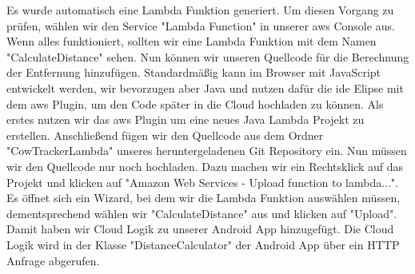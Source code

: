 Es wurde automatisch eine Lambda Funktion generiert. Um diesen Vorgang zu prüfen, wählen wir den Service "Lambda Function" in unserer \gls{aws} Console aus. Wenn alles funktioniert, sollten wir eine Lambda Funktion mit dem Namen "CalculateDistance" sehen. Nun können wir unseren Quellcode für die Berechnung der Entfernung hinzufügen. Standardmäßig kann im Browser mit JavaScript entwickelt werden, wir bevorzugen aber Java und nutzen dafür die \gls{ide} Elipse mit dem \gls{aws} Plugin, um den Code später in die Cloud hochladen zu können. Als erstes nutzen wir das \gls{aws} Plugin um eine neues Java Lambda Projekt zu erstellen. Anschließend fügen wir den Quellcode aus dem Ordner "CowTrackerLambda" unseres heruntergeladenen Git Repository ein. Nun müssen wir den Quellcode nur noch hochladen. Dazu machen wir ein Rechtsklick auf das Projekt und klicken auf "Amazon Web Services - Upload function to lambda...". Es öffnet sich ein Wizard, bei dem wir die Lambda Funktion auswählen müssen, dementsprechend wählen wir "CalculateDistance" aus und klicken auf "Upload". Damit haben wir Cloud Logik zu unserer Android App hinzugefügt. Die Cloud Logik wird in der Klasse "DistanceCalculator" der Android App über ein HTTP Anfrage abgerufen. 

